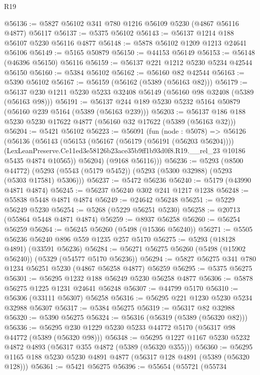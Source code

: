 \begin{lexlean}{R19}
\begin{coremodule}
@56136 := @5827 @56102 @341 @780 @1216 @56109 @5230 (@4867 @56116 @4877) @56117
@56137 := @5375 @56102
@56143 := @56137 @1214 @188 @56107 @5230 @56116 @4877
@56148 := @5878 @56102 @1209 @1213 @24641 @56106
@56149 := @5165 @50879
@56150 := @44153 @56149
@56153 := @56148 (@46396 @56150) @56116
@56159 := @56137 @221 @1212 @5230 @5234 @42544 @56150
@56160 := @5384 @56102
@56162 := @56160 @82 @42544
@56163 := @5390 @56102
@56167 := @56159 (@56162 (@5389 (@56163 @82)))
@56179 := @56137 @230 @1211 @5230 @5233 @32408 @56149 (@56160 @98 @32408 (@5389 (@56163 @98)))
@56191 := @56137 @244 @189 @5230 @5232 @5164 @50879 (@56160 @239 @5164 (@5389 (@56163 @239)))
@56203 := @56137 @186 @188 @5230 @5230 @17622 @4877 (@56160 @32 @17622 (@5389 (@56163 @32)))
@56204 := @5421 @56102
@56223 := @56091
    (fun (node : @5078) =>
    @56126
      (@56136
        (@56143
          (@56153
            (@56167 (@56179 (@56191 (@56203 @56204))))
            (LexLeanPreserve.Ce11ed3e58126b23ace35b9ff1b93d0f8.R19.__rel_23
              @10186
              @5435
              @4874
              @10565))
          @56204)
        (@9168 @56116)))
@56236 := @5293
    (@8500 @44772)
    (@5293 (@5543 (@5179 @5452)) (@5293 (@5300 @32988) (@5293 (@5303 @17581) @5306)))
@56237 := @5472 @56236
@56240 := @5179 (@43990 @4871 @4874)
@56245 := @56237 @56240 @302 @241 @1217 @1238
@56248 := @55838 @5448 @4871 @4874
@56249 := @24642 @56248
@56251 := @5229 @56249 @5230
@56254 := @5268 (@5229 @56251 @5230)
@56258 := @20713 (@55864 @5448 @4871 @4874)
@56259 := @8937 @56258
@56260 := @56254 @56259
@56264 := @56245 @56260 (@5498 (@15366 @56240))
@56271 := @5505 @56236 @56240 @896 @559 @1235 @257 @5170
@56275 := @5293 (@18128 @4891) (@33591 @56236)
@56284 := @56271 @56275 @56260 (@5498 (@15902 @56240)) (@5329 (@54577 @5170 @56236))
@56294 := @5827 @56275 @341 @780 @1234 @56251 @5230 (@4867 @56258 @4877) @56259
@56295 := @5375 @56275
@56301 := @56295 @1232 @188 @56249 @5230 @56258 @4877
@56306 := @5878 @56275 @1225 @1231 @24641 @56248
@56307 := @44799 @5170
@56310 := @56306 (@33111 @56307) @56258
@56316 := @56295 @221 @1230 @5230 @5234 @32988 @56307
@56317 := @5384 @56275
@56319 := @56317 @82 @32988
@56320 := @5390 @56275
@56324 := @56316 (@56319 (@5389 (@56320 @82)))
@56336 := @56295 @230 @1229 @5230 @5233 @44772 @5170 (@56317 @98 @44772 (@5389 (@56320 @98)))
@56348 := @56295 @1227 @1167 @5230 @5232 @4872 @4893 (@56317 @355 @4872 (@5389 (@56320 @355)))
@56360 := @56295 @1165 @188 @5230 @5230 @4891 @4877 (@56317 @128 @4891 (@5389 (@56320 @128)))
@56361 := @5421 @56275
@56396 := @55654
    (@55721
      (@55734

\end{coremodule}
\end{lexlean}

